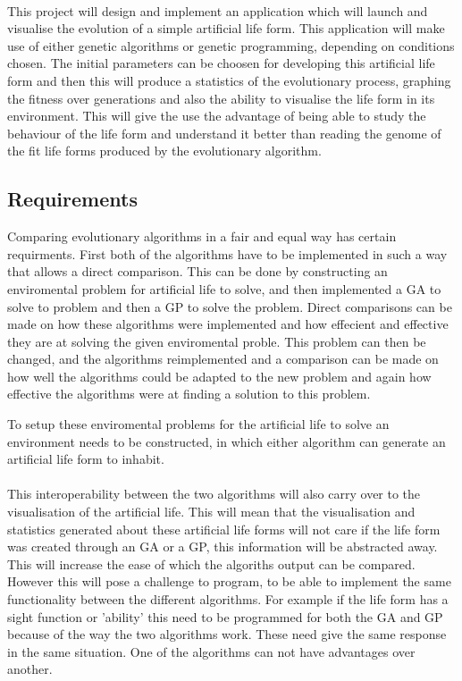 \documentclass[10pt,twocolumn]{article}
\begin{document}
\paragraph{}
This project will design and implement an application which will launch and visualise the evolution of a
simple artificial life form. This application will make use of either genetic algorithms or genetic programming,
depending on conditions chosen. The initial parameters can be choosen for developing this artificial life form
and then this will produce a statistics of the evolutionary process, graphing the fitness over generations
and also the ability to visualise the life form in its environment. This will give the use the advantage of being
able to study the behaviour of the life form and understand it better than reading the genome of the fit life forms
produced by the evolutionary algorithm.


\paragraph{}

\subsection{Requirements}
Comparing evolutionary algorithms in a fair and equal way has certain requirments. First both of the algorithms have to be implemented in such a way that allows a direct comparison. 
This can be done by constructing an enviromental problem for artificial life to solve, and then implemented a GA to solve to problem and then a GP to solve the problem. Direct
comparisons can be made on how these algorithms were implemented and how effecient and effective they are at solving the given enviromental proble. This problem can then be changed, 
and the algorithms reimplemented and a comparison can be made on how well the algorithms could be adapted to the new problem and again how effective the algorithms were at
finding a solution to this problem.

To setup these enviromental problems for the artificial life to solve an environment needs to be constructed, in which either algorithm can generate an artificial life form
to inhabit.

\paragraph{}
This interoperability between the two algorithms will also carry over to the visualisation of the artificial life. This will mean
that the visualisation and statistics generated about these artificial life forms will not care if the life form was created
through an GA or a GP, this information will be abstracted away. This will increase the ease of which the algoriths output can
be compared. However this will pose a challenge to program, to be able to implement the same functionality between the 
different algorithms. For example if the life form has a sight function or 'ability' this need to be programmed for both
the GA and GP because of the way the two algorithms work. These need give the same response in the same situation. One of the
algorithms can not have advantages over another.
	
\end{document}
